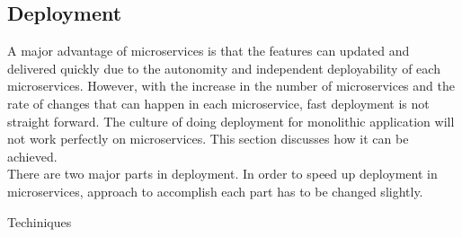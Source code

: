 \subsection{Deployment}\label{section:challanges_of_microservices_architecture/deployment}
A major advantage of microservices is that the features can updated and delivered quickly due to the autonomity and independent deployability of each microservices. However, with the increase in the number of microservices and the rate of changes that can happen in each microservice, fast deployment is not straight forward. The culture of doing deployment for monolithic application will not work perfectly on microservices. This section discusses how it can be achieved.
\\
There are two major parts in deployment. In order to speed up deployment in microservices, approach to accomplish each part has to be changed slightly.
\begin{shaded}Techiniques\end{shaded}
